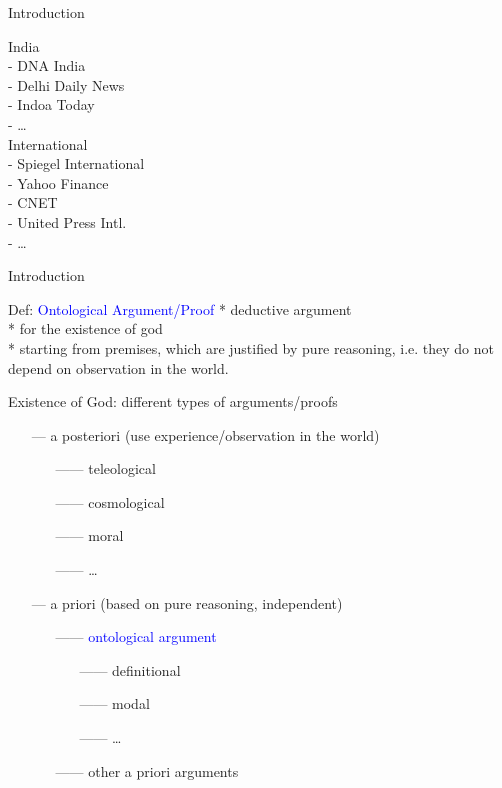 \begin{frame}{Introduction}
\begin{minipage}{.3\textwidth}
India \\
- DNA India \\
- Delhi Daily News \\
- Indoa Today \\
- \ldots \\

International \\
- Spiegel International \\
- Yahoo Finance \\
- CNET \\
- United Press Intl. \\
- \ldots
\end{minipage}
\end{frame}


\begin{frame}{Introduction}\large
\begin{block}{Def: \textcolor{blue}{Ontological Argument/Proof}}
* deductive argument \\

* for the existence of god \\

* starting from premises, which are justified by pure reasoning,
i.e. they do not depend on observation in the world.
\end{block}

\vfill \pause
Existence of God: different types of arguments/proofs\\[.2em]
\begin{itemize}
\item[---]a posteriori (use experience/observation in the world)
  \begin{itemize}
  \item[------]teleological
  \item[------]cosmological
  \item[------]moral
  \item[------] \ldots
  \end{itemize}  
\item[---]a priori (based on pure reasoning, independent)
  \begin{itemize}
  \item[------]\textcolor{blue}{ontological argument}
    \begin{itemize}
    \item[------]definitional 
    \item[------]modal 
    \item[------] \ldots
    \end{itemize}
  \item[------]other a priori arguments
  \end{itemize}
\end{itemize}
\end{frame}

